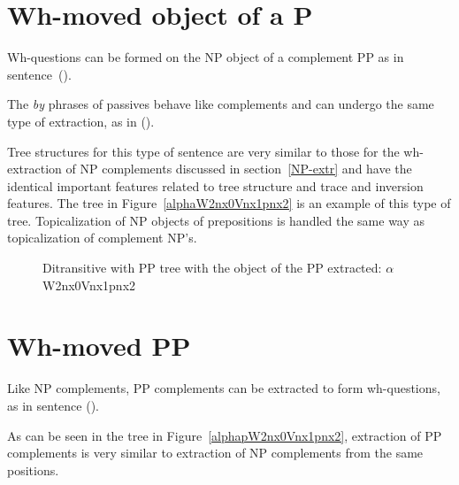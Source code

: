 

\section{Wh-moved object of a P}
Wh-questions can be formed on the NP object of a complement PP as in
sentence~().


The {\it by} phrases of passives behave like complements and can undergo the
same type of extraction, as in ().


Tree structures for this type of sentence are very similar to those for the
wh-extraction of NP complements discussed in section~\ref{NP-extr} and have the
identical important features related to tree structure and trace and inversion
features.  The tree in Figure~\ref{alphaW2nx0Vnx1pnx2} is an example of this
type of tree.  Topicalization of NP objects of prepositions is handled the same
way as topicalization of complement NP's.

\begin{figure}[htb]
\centering
\mbox{}
\caption{Ditransitive with PP tree with the object of the PP extracted: $\alpha$W2nx0Vnx1pnx2}
\label{alphaW2nx0Vnx1pnx2}
\label{2;8,4}
\end{figure}



\section{Wh-moved PP}
Like NP complements, PP complements can be extracted to form
wh-questions, as in sentence ().


As can be seen in the tree in Figure~\ref{alphapW2nx0Vnx1pnx2}, extraction of
PP complements is very similar to extraction of NP complements from the same
positions.


